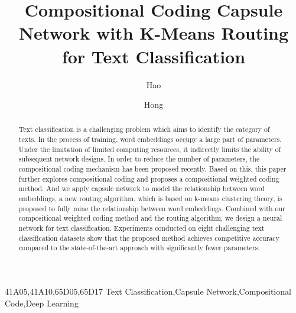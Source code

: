 \documentclass[times,twocolumn,final]{elsarticle}
\begin{document}
\newcommand{\etal}{\textit{et al}.}
\newcommand{\ie}{\textit{i}.\textit{e}.}
\newcommand{\eg}{\textit{e}.\textit{g}.}

\ifpreprint
  \setcounter{page}{1}
\else
  \setcounter{page}{1}
\fi

\begin{frontmatter}

\title{Compositional Coding Capsule Network with K-Means Routing for Text Classification}

\author[1]{Hao } 
\author[1]{Hong }

\address[1]{School of Computer Science, Fudan University, 220 Handan Rd., Yangpu District, Shanghai, 200433, China}



\begin{abstract}
Text classification is a challenging problem which aims to identify the category of texts. In the process of training, word embeddings occupy a large part of parameters. Under the limitation of limited computing resources, it indirectly limits the ability of subsequent network designs. In order to reduce the number of parameters, the compositional coding mechanism has been proposed recently. Based on this, this paper further explores compositional coding and proposes a compositional weighted coding method. And we apply capsule network to model the relationship between word embeddings, a new routing algorithm, which is based on k-means clustering theory, is proposed to fully mine the relationship between word embeddings. Combined with our compositional weighted coding method and the routing algorithm, we design a neural network for text classification. Experiments conducted on eight challenging text classification datasets show that the proposed method achieves competitive accuracy compared to the state-of-the-art approach with significantly fewer parameters.
\end{abstract}

\begin{keyword}
\MSC 41A05\sep 41A10\sep 65D05\sep 65D17
\KWD Text Classification\sep Capsule Network\sep Compositional Code\sep Deep Learning
\end{keyword}

\end{frontmatter}
\end{document}
